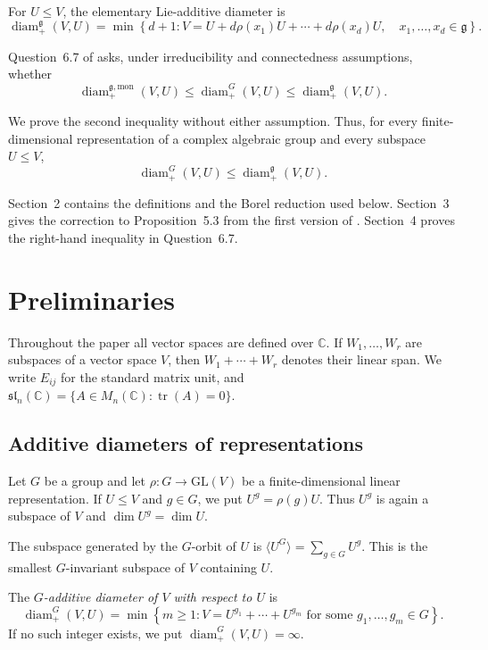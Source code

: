 \documentclass[11pt]{article}
\theoremstyle{remark}
\newcommand{\C}{\mathbb C}
\begin{document}
For $U\leq V$, the elementary Lie-additive diameter is
$$
\operatorname{diam}^{\mathfrak g}_{+}(V,U)
=
\min\left\{
d+1:
V=
U+d\rho(x_1)U+\cdots+d\rho(x_d)U,
\quad
x_1,\ldots,x_d\in\mathfrak g
\right\}.
$$

Question~6.7 of \cite{JezernikSpenko} asks, under irreducibility and connectedness assumptions, whether
$$
\operatorname{diam}^{\mathfrak g,\mathrm{mon}}_{+}(V,U)
\leq
\operatorname{diam}^{G}_{+}(V,U)
\leq
\operatorname{diam}^{\mathfrak g}_{+}(V,U).
$$

We prove the second inequality without either assumption. Thus, for every finite-dimensional representation of a complex algebraic group and every subspace $U\leq V$,
$$
\operatorname{diam}^{G}_{+}(V,U)
\leq
\operatorname{diam}^{\mathfrak g}_{+}(V,U).
$$

Section~2 contains the definitions and the Borel reduction used below. Section~3 gives the correction to Proposition~5.3 from the first version of \cite{JezernikSpenko}. Section~4 proves the right-hand inequality in Question~6.7.


\section{Preliminaries}

Throughout the paper all vector spaces are defined over $\C$.  If
$W_1,\ldots,W_r$ are subspaces of a vector space $V$, then $ W_1+\cdots+W_r$
denotes their linear span.  We write $E_{ij}$ for the standard matrix unit,
and
$\mathfrak{sl}_n(\C)
 =
 \{A\in M_n(\C):\operatorname{tr}(A)=0\}.$

\subsection{Additive diameters of representations}

Let $G$ be a group and let $\rho:G\longrightarrow \mathrm{GL}(V)$
be a finite-dimensional linear representation.  If $U\leq V$ and $g\in G$,
we put $U^g=\rho(g)U.$
Thus $U^g$ is again a subspace of $V$ and $\dim U^g=\dim U.$

The subspace generated by the $G$-orbit of $U$ is $\langle U^G\rangle
 =
 \sum_{g\in G}U^g.$ This is the smallest $G$-invariant subspace of $V$ containing $U$.

The \emph{$G$-additive diameter of $V$ with respect to $U$} is
\[
 \operatorname{diam}^{G}_{+}(V,U)
 =
 \min\left\{
 m\geq1:
 V=U^{g_1}+\cdots+U^{g_m}
 \text{ for some }g_1,\ldots,g_m\in G
 \right\}.
\]
If no such integer exists, we put $\operatorname{diam}^{G}_{+}(V,U)=\infty.$
\end{document}

